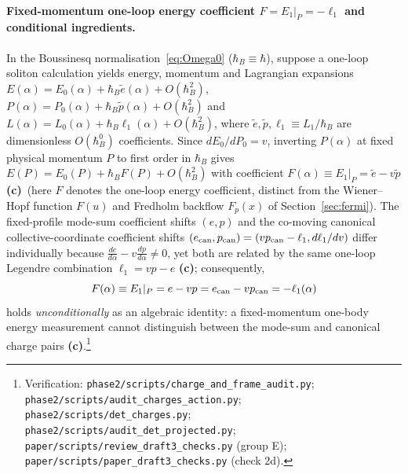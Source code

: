 \documentclass[11pt,a4paper]{article}
\newcommand{\lab}[1]{{\normalfont\sffamily\footnotesize\bfseries(#1)}}
\newcommand{\Lc}{\lab{c}}
\newcommand{\scr}[1]{\nolinkurl{#1}}
\newcommand{\chk}[1]{\footnote{\raggedright Verification: #1.}}
\newcommand{\hb}{\hbar}
\theoremstyle{remark}
\begin{document}
\paragraph{Fixed-momentum one-loop energy coefficient $F=E_1|_P=-\ell_1$ and conditional ingredients.} In the Boussinesq normalisation~\eqref{eq:Omega0} ($\hb_B\equiv\hb$), suppose a one-loop soliton calculation yields energy, momentum and Lagrangian expansions $E(\alpha)=E_0(\alpha)+\hb_B\tilde e(\alpha)+O(\hb_B^2)$, $P(\alpha)=P_0(\alpha)+\hb_B\tilde p(\alpha)+O(\hb_B^2)$ and $L(\alpha)=L_0(\alpha)+\hb_B\ell_1(\alpha)+O(\hb_B^2)$, where $\tilde e,\tilde p,\ell_1\equiv L_1/\hb_B$ are dimensionless $O(\hb_B^0)$ coefficients. Since $dE_0/dP_0=v$, inverting $P(\alpha)$ at fixed physical momentum $P$ to first order in $\hb_B$ gives $E(P)=E_0(P)+\hb_B F(P)+O(\hb_B^2)$ with coefficient $F(\alpha)\equiv E_1|_P=\tilde e-v\tilde p$ \Lc\ (here $F$ denotes the one-loop energy coefficient, distinct from the Wiener--Hopf function $F(u)$ and Fredholm backflow $F_p(x)$ of Section~\ref{sec:fermi}). The fixed-profile mode-sum coefficient shifts $(e,p)$ and the co-moving canonical collective-coordinate coefficient shifts $(e_{\rm can},p_{\rm can})=(vp_{\rm can}-\ell_1,d\ell_1/dv)$ differ individually because $\frac{de}{d\alpha}-v\frac{dp}{d\alpha}\neq0$, yet both are related by the same one-loop Legendre combination $\ell_1=vp-e$ \Lc; consequently,
\begin{equation}\label{eq:E1Pinv}
F(\alpha)\equiv E_1|_P=e-vp=e_{\rm can}-vp_{\rm can}=-\ell_1(\alpha)
\end{equation}
holds \emph{unconditionally} as an algebraic identity: a fixed-momentum one-body energy measurement cannot distinguish between the mode-sum and canonical charge pairs \Lc.\chk{\scr{phase2/scripts/charge_and_frame_audit.py}; \scr{phase2/scripts/audit_charges_action.py}; \scr{phase2/scripts/det_charges.py}; \scr{phase2/scripts/audit_det_projected.py}; \scr{paper/scripts/review_draft3_checks.py} (group E); \scr{paper/scripts/paper_draft3_checks.py} (check 2d)}
\end{document}
